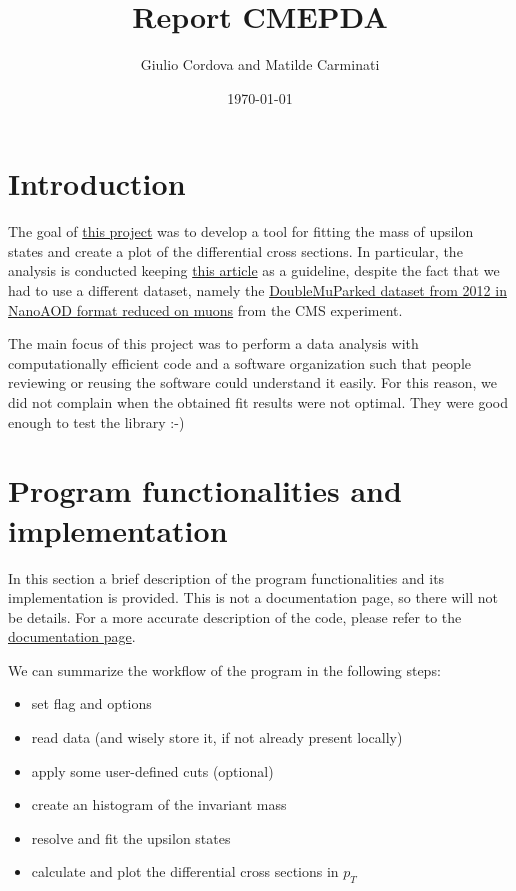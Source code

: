 \documentclass{article}
\title{Report CMEPDA}
\author{Giulio Cordova and Matilde Carminati}
\date{\today}
\begin{document}
\maketitle

\section{Introduction}
The goal of \href{https://github.com/zenith378/Y-DiMuonResonances/tree/main}{this project} was to develop a tool for fitting the mass of upsilon states and create a plot of the differential cross sections. In particular, the analysis is conducted keeping \href{https://twiki.cern.ch/twiki/bin/view/CMSPublic/PhysicsResultsBPH12006}{this article} as a guideline, despite the fact that we had to use a different dataset, namely the \href{http://opendata.web.cern.ch/record/12341}{DoubleMuParked dataset from 2012 in NanoAOD format reduced on muons} from the CMS experiment.

The main focus of this project was to perform a data analysis with computationally efficient code and a software organization such that people reviewing or reusing the software could understand it easily. For this reason, we did not complain when the obtained fit results were not optimal. They were good enough to test the library :-)

\section{Program functionalities and implementation}
In this section a brief description of the program functionalities and its implementation is provided. This is not a documentation page, so there will not be details. For a more accurate description of the code, please refer to the \href{https://zenith378.github.io/Y-DiMuonResonances/html/index.html}{documentation page}.

We can summarize the workflow of the program in the following steps:
\begin{itemize}
    \item set flag and options
    \item read data (and wisely store it, if not already present locally)
    \item apply some user-defined cuts (optional)
    \item create an histogram of the invariant mass
    \item resolve and fit the upsilon states
    \item calculate and plot the differential cross sections in $p_T$
\end{itemize}
\end{document}
